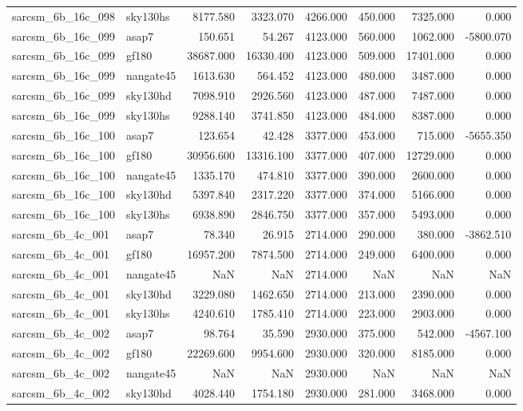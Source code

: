 \begin{tabular}{llrrrrrr}
sarcsm\_6b\_16c\_098 & sky130hs & 8177.580 & 3323.070 & 4266.000 & 450.000 & 7325.000 & 0.000 \\
sarcsm\_6b\_16c\_099 & asap7 & 150.651 & 54.267 & 4123.000 & 560.000 & 1062.000 & -5800.070 \\
sarcsm\_6b\_16c\_099 & gf180 & 38687.000 & 16330.400 & 4123.000 & 509.000 & 17401.000 & 0.000 \\
sarcsm\_6b\_16c\_099 & nangate45 & 1613.630 & 564.452 & 4123.000 & 480.000 & 3487.000 & 0.000 \\
sarcsm\_6b\_16c\_099 & sky130hd & 7098.910 & 2926.560 & 4123.000 & 487.000 & 7487.000 & 0.000 \\
sarcsm\_6b\_16c\_099 & sky130hs & 9288.140 & 3741.850 & 4123.000 & 484.000 & 8387.000 & 0.000 \\
sarcsm\_6b\_16c\_100 & asap7 & 123.654 & 42.428 & 3377.000 & 453.000 & 715.000 & -5655.350 \\
sarcsm\_6b\_16c\_100 & gf180 & 30956.600 & 13316.100 & 3377.000 & 407.000 & 12729.000 & 0.000 \\
sarcsm\_6b\_16c\_100 & nangate45 & 1335.170 & 474.810 & 3377.000 & 390.000 & 2600.000 & 0.000 \\
sarcsm\_6b\_16c\_100 & sky130hd & 5397.840 & 2317.220 & 3377.000 & 374.000 & 5166.000 & 0.000 \\
sarcsm\_6b\_16c\_100 & sky130hs & 6938.890 & 2846.750 & 3377.000 & 357.000 & 5493.000 & 0.000 \\
sarcsm\_6b\_4c\_001 & asap7 & 78.340 & 26.915 & 2714.000 & 290.000 & 380.000 & -3862.510 \\
sarcsm\_6b\_4c\_001 & gf180 & 16957.200 & 7874.500 & 2714.000 & 249.000 & 6400.000 & 0.000 \\
sarcsm\_6b\_4c\_001 & nangate45 & NaN & NaN & 2714.000 & NaN & NaN & NaN \\
sarcsm\_6b\_4c\_001 & sky130hd & 3229.080 & 1462.650 & 2714.000 & 213.000 & 2390.000 & 0.000 \\
sarcsm\_6b\_4c\_001 & sky130hs & 4240.610 & 1785.410 & 2714.000 & 223.000 & 2903.000 & 0.000 \\
sarcsm\_6b\_4c\_002 & asap7 & 98.764 & 35.590 & 2930.000 & 375.000 & 542.000 & -4567.100 \\
sarcsm\_6b\_4c\_002 & gf180 & 22269.600 & 9954.600 & 2930.000 & 320.000 & 8185.000 & 0.000 \\
sarcsm\_6b\_4c\_002 & nangate45 & NaN & NaN & 2930.000 & NaN & NaN & NaN \\
sarcsm\_6b\_4c\_002 & sky130hd & 4028.440 & 1754.180 & 2930.000 & 281.000 & 3468.000 & 0.000 \\

\end{tabular}

